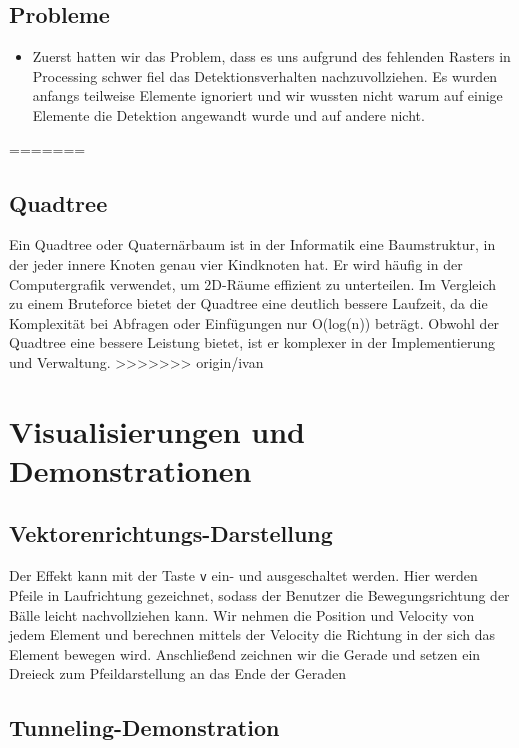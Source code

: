 \documentclass[12pt,a4paper]{article}
\begin{document}
	\subsection{Probleme}
	\begin{itemize}
		\item
		Zuerst hatten wir das Problem, dass es uns aufgrund des fehlenden Rasters in Processing schwer fiel das Detektionsverhalten nachzuvollziehen. Es wurden anfangs teilweise Elemente ignoriert und wir wussten nicht warum auf einige Elemente die Detektion angewandt wurde und auf andere nicht.
	\end{itemize}
=======
\subsection{Quadtree}
Ein Quadtree oder Quaternärbaum ist in der Informatik eine Baumstruktur, in der jeder innere Knoten genau vier Kindknoten hat. \cite{Quadtree} Er wird häufig in der Computergrafik verwendet, um 2D-Räume effizient zu unterteilen. Im Vergleich zu einem Bruteforce bietet der Quadtree eine deutlich bessere Laufzeit, da die Komplexität bei Abfragen oder Einfügungen nur O(log(n)) beträgt. Obwohl der Quadtree eine bessere Leistung bietet, ist er komplexer in der Implementierung und Verwaltung.
>>>>>>> origin/ivan

	
	\section{Visualisierungen und Demonstrationen}
	
	
	\subsection{Vektorenrichtungs-Darstellung}
	
	Der Effekt kann mit der Taste \texttt{v} ein- und ausgeschaltet werden.  
	Hier werden Pfeile in Laufrichtung gezeichnet, sodass der Benutzer die Bewegungsrichtung der Bälle leicht nachvollziehen kann.  
	Wir nehmen die Position und Velocity von jedem Element und berechnen mittels der Velocity die Richtung in der sich das Element bewegen wird. Anschließend zeichnen wir die Gerade und setzen ein Dreieck zum Pfeildarstellung an das Ende der Geraden
		
	
	\subsection{Tunneling-Demonstration}
	
\end{document}
